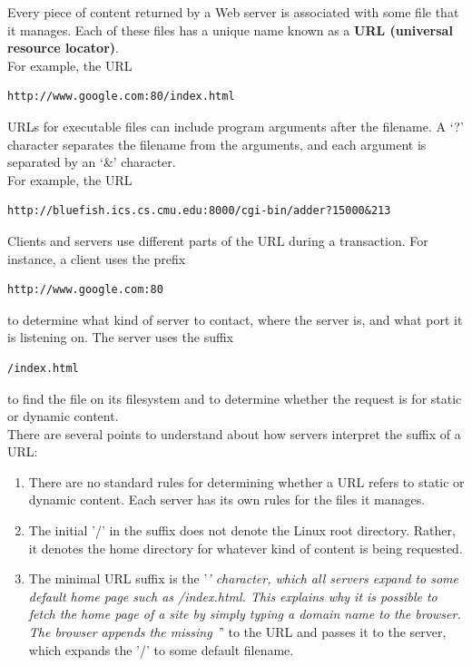 \documentclass[11pt]{article}
\begin{document}
Every piece of content returned by a Web server is associated with some file that it manages. Each of these files has a unique name known as a \textbf{URL (universal resource locator)}.\\
For example, the URL\\
\begin{verbatim}
http://www.google.com:80/index.html
\end{verbatim}



URLs for executable files can include program arguments after the filename. A ‘?’ character separates the filename from the arguments, and each argument is separated by an ‘\&’ character.\\
For example, the URL\\
\begin{verbatim}
http://bluefish.ics.cs.cmu.edu:8000/cgi-bin/adder?15000&213
\end{verbatim}



Clients and servers use different parts of the URL during a transaction. For instance, a client uses the prefix\\
\begin{verbatim}
http://www.google.com:80
\end{verbatim}
to determine what kind of server to contact, where the server is, and what port it is listening on. The server uses the suffix\\
\begin{verbatim}
/index.html
\end{verbatim}
to find the file on its filesystem and to determine whether the request is for static or dynamic content.\\


There are several points to understand about how servers interpret the suffix of a URL:\\
\begin{enumerate}
\item There are no standard rules for determining whether a URL refers to static or dynamic content. Each server has its own rules for the files it manages.\\
\item The initial '/' in the suffix does not denote the Linux root directory. Rather, it denotes the home directory for whatever kind of content is being requested.\\
\item The minimal URL suffix is the '\emph{' character, which all servers expand to some default home page such as /index.html. This explains why it is possible to fetch the home page of a site by simply typing a domain name to the browser. The browser appends the missing '}' to the URL and passes it to the server, which expands the '/' to some default filename.\\
\end{enumerate}
\end{document}
